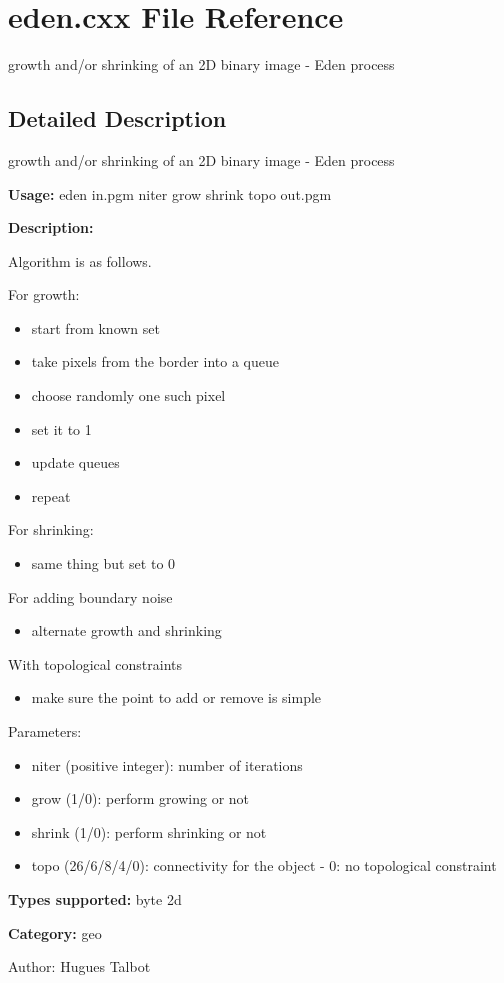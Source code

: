 \section{eden.cxx File Reference}
\label{eden_8cxx}
growth and/or shrinking of an 2D binary image - Eden process  




\label{_details}
\subsection{Detailed Description}
growth and/or shrinking of an 2D binary image - Eden process 

{\bf Usage:} eden in.pgm niter grow shrink topo out.pgm

{\bf Description:}

Algorithm is as follows.

For growth: \begin{itemize}
\item start from known set \item take pixels from the border into a queue \item choose randomly one such pixel \item set it to 1 \item update queues \item repeat\end{itemize}
For shrinking: \begin{itemize}
\item same thing but set to 0\end{itemize}
For adding boundary noise \begin{itemize}
\item alternate growth and shrinking\end{itemize}
With topological constraints \begin{itemize}
\item make sure the point to add or remove is simple\end{itemize}
Parameters: \begin{itemize}
\item niter (positive integer): number of iterations \item grow (1/0): perform growing or not \item shrink (1/0): perform shrinking or not \item topo (26/6/8/4/0): connectivity for the object - 0: no topological constraint\end{itemize}
{\bf Types supported:} byte 2d

{\bf Category:} geo

\begin{Desc}
\item[Author:]Hugues Talbot \end{Desc}

